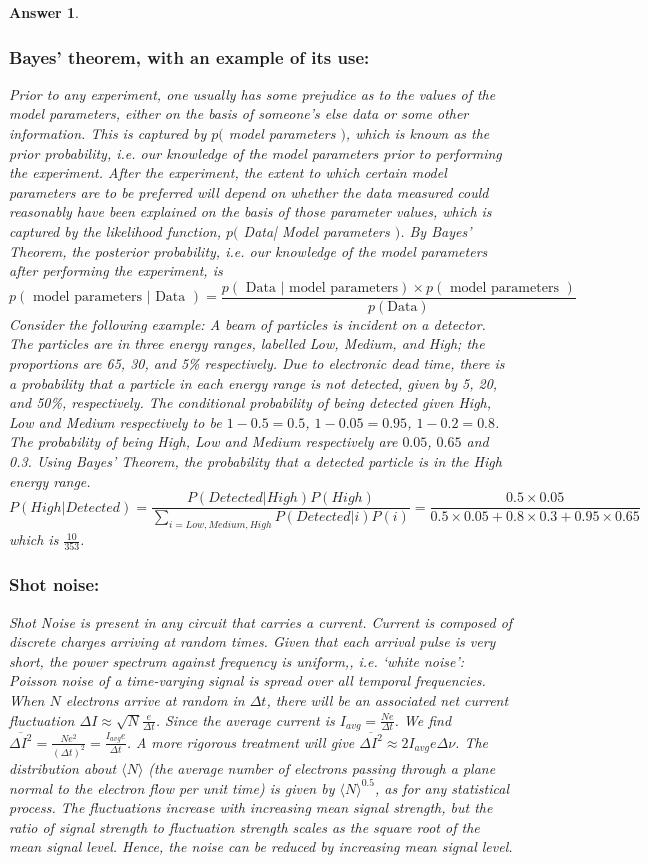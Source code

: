 \documentclass[a4paper]{article}
\newtheorem{ans}{Answer}[subsection]
\theoremstyle{new}
\begin{document}
\begin{ans}
\subsubsection*{Bayes' theorem, with an example of its use:}
Prior to any experiment, one usually has some prejudice as to the values of the model parameters, either on the basis of someone's else data or some other information. This is captured by $p($ model parameters $)$, which is known as the prior probability, i.e. our knowledge of the model parameters prior to performing the experiment. After the experiment, the extent to which certain model parameters are to be preferred will depend on whether the data measured could reasonably have been explained on the basis of those parameter values, which is captured by the likelihood function, $p($ Data| Model parameters $)$. By Bayes' Theorem, the posterior probability, i.e. our knowledge of the model parameters after performing the experiment, is
$$p(\text{ model parameters | Data })=\frac{p(\text{ Data | model parameters})\times p(\text{ model parameters })}{p(\text{Data})}$$
Consider the following example: A beam of particles is incident on a detector. The particles are in three energy ranges, labelled Low, Medium, and High; the proportions are 65, 30, and 5\% respectively. Due to electronic dead time, there is a probability that a particle in each energy range is not detected, given by 5, 20, and 50\%, respectively. The conditional probability of being detected given High, Low and Medium respectively to be $1-0.5=0.5$, $1-0.05=0.95$, $1-0.2=0.8$. The probability of being High, Low and Medium respectively are $0.05$, $0.65$ and 0.3. Using Bayes' Theorem, the probability that a detected particle is in the High energy range.
$$P(High|Detected)=\frac{P(Detected|High)P(High)}{\sum_{i=Low,Medium,High}P(Detected|i)P(i)}=\frac{0.5\times 0.05}{0.5\times0.05+0.8\times0.3+0.95\times0.65}$$
which is $\frac{10}{353}$.
\subsubsection*{Shot noise:}
Shot Noise is present in any circuit that carries a current. Current is composed of discrete charges arriving at random times. Given that each arrival pulse is very short, the power spectrum against frequency is uniform,, i.e. `white noise': Poisson noise of a time-varying signal is spread over all temporal frequencies. When $N$ electrons arrive at random in $\Delta t$, there will be an associated net current fluctuation $\Delta I\approx\sqrt{N}\frac{e}{\Delta t}$. Since the average current is $I_{avg}=\frac{Ne}{\Delta t}$. We find $\overline{\Delta I^2}=\frac{Ne^2}{(\Delta t)^2}=\frac{I_{avg}e}{\Delta t}$. A more rigorous treatment will give $\overline{\Delta I^2}\approx 2I_{avg}e\Delta \nu$. The distribution about $\langle N\rangle$ (the average number of electrons passing through a plane normal to the electron flow per unit time) is given by $\langle N\rangle^{0.5}$, as for any statistical process. The fluctuations increase with increasing mean signal strength, but the ratio of signal strength to fluctuation strength scales as the square root of the mean signal level. Hence, the noise can be reduced by increasing mean signal level.
\end{ans}
\newpage
\end{document}
